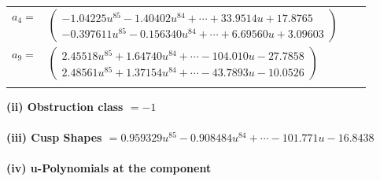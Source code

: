 \documentclass[1p]{elsarticle_modified}
\theoremstyle{definition}
\begin{document}
\begin{tabular}{m{7pt} m{180pt} m{7pt} m{180pt} }
\flushright $a_{4}=$&$\begin{pmatrix}-1.04225 u^{85}-1.40402 u^{84}+\cdots+33.9514 u+17.8765\\-0.397611 u^{85}-0.156340 u^{84}+\cdots+6.69560 u+3.09603\end{pmatrix}$ \\
\flushright $a_{9}=$&$\begin{pmatrix}2.45518 u^{85}+1.64740 u^{84}+\cdots-104.010 u-27.7858\\2.48561 u^{85}+1.37154 u^{84}+\cdots-43.7893 u-10.0526\end{pmatrix}$\\&\end{tabular}
\flushleft \textbf{(ii) Obstruction class $= -1$}\\~\\
\flushleft \textbf{(iii) Cusp Shapes $= 0.959329 u^{85}-0.908484 u^{84}+\cdots-101.771 u-16.8438$}\\~\\
\newpage\renewcommand{\arraystretch}{1}
\flushleft \textbf{(iv) u-Polynomials at the component}\newline \\
\end{document}
